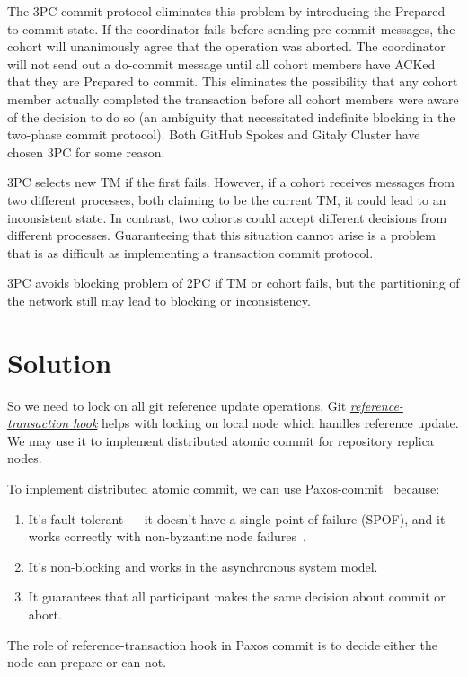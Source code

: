 \documentclass[sigplan, screen, nonacm, 11pt]{acmart}
\begin{document}
The 3PC commit protocol eliminates this problem by introducing the Prepared to commit state.
If the coordinator fails before sending pre-commit messages, the cohort will unanimously agree that the operation was aborted.
The coordinator will not send out a do-commit message until all cohort members have ACKed that they are Prepared to commit.
This eliminates the possibility that any cohort member actually completed the transaction before all cohort
members were aware of the decision to do so (an ambiguity that necessitated indefinite blocking
in the two-phase commit protocol). Both GitHub Spokes and Gitaly Cluster have chosen 3PC for some reason.

3PC selects new TM if the first fails.
However, if a cohort receives messages from two different processes,
both claiming to be the current TM, it could lead to an inconsistent state.
In contrast, two cohorts could accept different decisions from different processes.
Guaranteeing that this situation cannot arise is a problem
that is as difficult as implementing a transaction commit protocol.

3PC avoids blocking problem of 2PC if TM or cohort fails,
but the partitioning of the network still may lead to blocking or inconsistency.


\section{Solution}

So we need to lock on all git reference update operations.
Git \emph{\href{https://git-scm.com/docs/githooks.html\#\_reference\_transaction}{reference-transaction hook}}
helps with locking on local node which handles reference update. We may use it to implement distributed atomic commit
for repository replica nodes.

To implement distributed atomic commit, we can use Paxos-commit~\cite{paxos-commit} because:
\begin{enumerate}
  \item It's fault-tolerant --- it doesn't have a single point of failure (SPOF), and it works correctly with
    non-byzantine node failures~\cite{byzantine-generals}.
  \item It's non-blocking and works in the asynchronous system model.
  \item It guarantees that all participant makes the same decision about commit or abort.
\end{enumerate}

The role of reference-transaction hook in Paxos commit is to decide either the node can prepare or can not.
\end{document}
